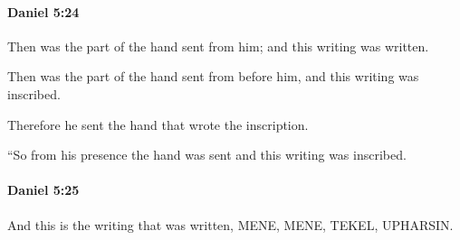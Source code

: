 		\paragraph{Daniel 5:24} %
			\label{DANIEL-5-24}

			Then was the part of the hand sent from him; and this writing was written.

			\begin{versebox}
					\item[BHS] 
					\item[ASV] Then was the part of the hand sent from before him, and this writing was inscribed.
					\item[NIV] Therefore he sent the hand that wrote the inscription.
					\item[NRSV] “So from his presence the hand was sent and this writing was inscribed.
			\end{versebox}

		\paragraph{Daniel 5:25} %
			\label{DANIEL-5-25}

			And this is the writing that was written, MENE, MENE, TEKEL, UPHARSIN.

